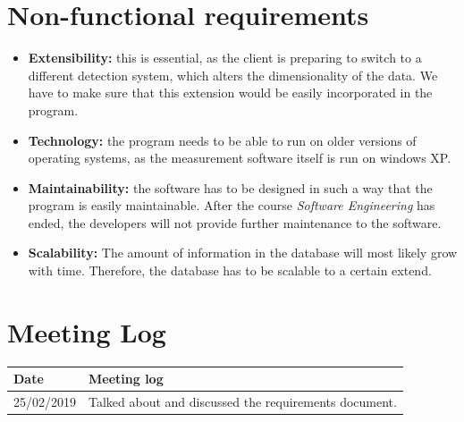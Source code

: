 \documentclass{article}
\begin{document}
\section{Non-functional requirements}
\begin{itemize}
	\item \textbf{Extensibility:} this is essential, as the client is preparing to switch to a different detection system, which alters the dimensionality of the data. We have to make sure that this extension would be easily incorporated in the program. 
	\item \textbf{Technology:} the program needs to be able to run on older versions of operating systems, as the measurement software itself is run on windows XP. 
	\item \textbf{Maintainability: } the software has to be designed in such a way that the program is easily  maintainable. After the course \textit{Software Engineering} has ended, the developers will not provide further maintenance to the software. 
	\item \textbf{Scalability: } The amount of information in the database will most likely grow with time. Therefore, the database has to be scalable to a certain extend. 
\end{itemize}
\printglossary[type =\acronymtype]

\printglossary

\section{Meeting Log}
\begin{center}
 \begin{tabular}{ | l | l | }
  \hline
  \bf{Date} & \bf{Meeting log} \\
  \hline
  25/02/2019 & Talked about and discussed the requirements document. \\
  \hline
 \end{tabular}
\end{center}

\newpage
\end{document}
